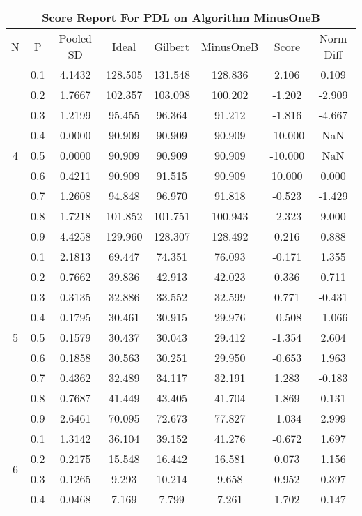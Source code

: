 \documentclass[11pt,a4paper]{report}
\begin{document}
\begin{longtable}{ | c | c || c | c | c | c | c | c | }
\hline
\multicolumn{8}{|c|}{ Score Report For PDL on Algorithm MinusOneB} \\
\hline
N & P & Pooled SD &  Ideal &  Gilbert & MinusOneB  & Score & Norm Diff \\
 \hline
 \hline
 \endhead
\multirow{9}{*}{4} & 0.1 & 4.1432 & 128.505 & 131.548 & 128.836 & 2.106 & 0.109 \\
 & 0.2 & 1.7667 & 102.357 & 103.098 & 100.202 & -1.202 & -2.909 \\
 & 0.3 & 1.2199 & 95.455 & 96.364 & 91.212 & -1.816 & -4.667 \\
 & 0.4 & 0.0000 & 90.909 & 90.909 & 90.909 & -10.000 & NaN \\
 & 0.5 & 0.0000 & 90.909 & 90.909 & 90.909 & -10.000 & NaN \\
 & 0.6 & 0.4211 & 90.909 & 91.515 & 90.909 & 10.000 & 0.000 \\
 & 0.7 & 1.2608 & 94.848 & 96.970 & 91.818 & -0.523 & -1.429 \\
 & 0.8 & 1.7218 & 101.852 & 101.751 & 100.943 & -2.323 & 9.000 \\
 & 0.9 & 4.4258 & 129.960 & 128.307 & 128.492 & 0.216 & 0.888 \\
 \hline
\multirow{9}{*}{5} & 0.1 & 2.1813 & 69.447 & 74.351 & 76.093 & -0.171 & 1.355 \\
 & 0.2 & 0.7662 & 39.836 & 42.913 & 42.023 & 0.336 & 0.711 \\
 & 0.3 & 0.3135 & 32.886 & 33.552 & 32.599 & 0.771 & -0.431 \\
 & 0.4 & 0.1795 & 30.461 & 30.915 & 29.976 & -0.508 & -1.066 \\
 & 0.5 & 0.1579 & 30.437 & 30.043 & 29.412 & -1.354 & 2.604 \\
 & 0.6 & 0.1858 & 30.563 & 30.251 & 29.950 & -0.653 & 1.963 \\
 & 0.7 & 0.4362 & 32.489 & 34.117 & 32.191 & 1.283 & -0.183 \\
 & 0.8 & 0.7687 & 41.449 & 43.405 & 41.704 & 1.869 & 0.131 \\
 & 0.9 & 2.6461 & 70.095 & 72.673 & 77.827 & -1.034 & 2.999 \\
 \hline
\multirow{9}{*}{6} & 0.1 & 1.3142 & 36.104 & 39.152 & 41.276 & -0.672 & 1.697 \\
 & 0.2 & 0.2175 & 15.548 & 16.442 & 16.581 & 0.073 & 1.156 \\
 & 0.3 & 0.1265 & 9.293 & 10.214 & 9.658 & 0.952 & 0.397 \\
 & 0.4 & 0.0468 & 7.169 & 7.799 & 7.261 & 1.702 & 0.147 \\

\end{longtable}
\end{document}
